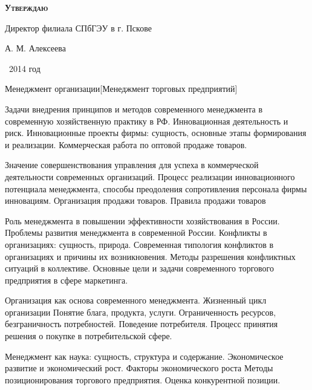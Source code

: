 \documentclass[
	11pt,
	a4paper,
	]
	{article}
\begin{document}
\newlength{\pblength}\settowidth{\pblength}{Директор филиала СПбГЭУ в г. Пскове}

\hfill\parbox{\pblength}{
	\textbf{\textsc{Утверждаю}}\medskip

	Директор филиала СПбГЭУ в г. Пскове\medskip

	\makebox[3cm]{\hrulefill} А. М. Алексеева\medskip

	\makebox[1.5cm]{<<\hrulefill>>} \makebox[3cm]{\hrulefill}\ 2014 год
}


 {Менеджмент организации}[Менеджмент торговых предприятий]

	

\noindent{} 
	{
		Задачи внедрения принципов и методов современного менеджмента в современную хозяйственную практику в РФ.
	}{
		Инновационная деятельность и риск. Инновационные проекты фирмы: сущность, основные этапы формирования и реализации.
	}{
		Коммерческая работа по оптовой продаже товаров.
	}

\bigskip

\noindent{} 
	{
		Значение совершенствования управления для успеха в коммерческой деятельности современных организаций.
	}{
		Процесс реализации инновационного потенциала менеджмента, способы преодоления сопротивления персонала фирмы инновациям.
	}{
		Организация продажи товаров. Правила продажи товаров
	}

\bigskip

\noindent{} 
	{
		Роль менеджмента в повышении эффективности хозяйствования в России. Проблемы развития менеджмента в современной России.
	}{
		Конфликты в организациях: сущность, природа. Современная типология конфликтов в организациях и причины их возникновения. Методы разрешения конфликтных ситуаций в коллективе.
	}{
		Основные цели и задачи современного торгового предприятия в сфере маркетинга.
	}

\bigskip

\noindent{} 
	{
		Организация как основа современного менеджмента. Жизненный цикл организации
	}{
		Понятие блага, продукта, услуги. Ограниченность ресурсов, безграничность потребностей.
	}{
		Поведение потребителя. Процесс принятия решения о покупке в потребительской сфере.
	}

\bigskip

\noindent{} 
	{
		Менеджмент как наука: сущность, структура и содержание.
	}{
		Экономическое развитие и экономический рост. Факторы экономического роста
	}{
		Методы позиционирования торгового предприятия. Оценка конкурентной позиции.
	}
\end{document}
